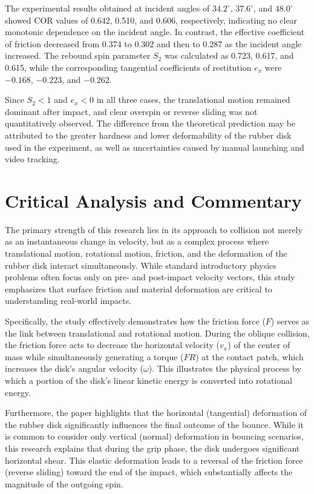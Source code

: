 \documentclass[11pt,letterpaper]{article}
\begin{document}
\noindent The experimental results obtained at incident angles of $34.2^\circ$, $37.6^\circ$, and $48.0^\circ$ showed COR values of 0.642, 0.510, and 0.606, respectively, indicating no clear monotonic dependence on the incident angle. In contrast, the effective coefficient of friction decreased from 0.374 to 0.302 and then to 0.287 as the incident angle increased. The rebound spin parameter $S_2$ was calculated as 0.723, 0.617, and 0.615, while the corresponding tangential coefficients of restitution $e_x$ were $-0.168$, $-0.223$, and $-0.262$.

\vspace{1em}
\noindent Since $S_2 < 1$ and $e_x < 0$ in all three cases, the translational motion remained dominant after impact, and clear overspin or reverse sliding was not quantitatively observed. The difference from the theoretical prediction may be attributed to the greater hardness and lower deformability of the rubber disk used in the experiment, as well as uncertainties caused by manual launching and video tracking.

\section{Critical Analysis and Commentary}
The primary strength of this research lies in its approach to collision not merely as an instantaneous change in velocity, but as a complex process where translational motion, rotational motion, friction, and the deformation of the rubber disk interact simultaneously. While standard introductory physics problems often focus only on pre- and post-impact velocity vectors, this study emphasizes that surface friction and material deformation are critical to understanding real-world impacts.

\noindent Specifically, the study effectively demonstrates how the friction force ($F$) serves as the link between translational and rotational motion. During the oblique collision, the friction force acts to decrease the horizontal velocity ($v_x$) of the center of mass while simultaneously generating a torque ($FR$) at the contact patch, which increases the disk's angular velocity ($\omega$). This illustrates the physical process by which a portion of the disk’s linear kinetic energy is converted into rotational energy.

\noindent Furthermore, the paper highlights that the horizontal (tangential) deformation of the rubber disk significantly influences the final outcome of the bounce. While it is common to consider only vertical (normal) deformation in bouncing scenarios, this research explains that during the grip phase, the disk undergoes significant horizontal shear. This elastic deformation leads to a reversal of the friction force (reverse sliding) toward the end of the impact, which substantially affects the magnitude of the outgoing spin.
\end{document}
